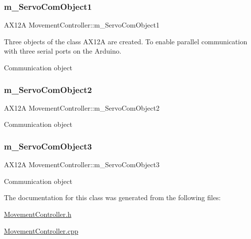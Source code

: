 \subsubsection{\texorpdfstring{m\+\_\+\+Servo\+Com\+Object1}{m\_ServoComObject1}}
{\footnotesize\ttfamily A\+X12A Movement\+Controller\+::m\+\_\+\+Servo\+Com\+Object1}



Three objects of the class A\+X12A are created. To enable parallel communication with three serial ports on the Arduino. 

Communication object \mbox{\label{class_movement_controller_abd74aff807ff311c6891311414ae3993}} 
\subsubsection{\texorpdfstring{m\+\_\+\+Servo\+Com\+Object2}{m\_ServoComObject2}}
{\footnotesize\ttfamily A\+X12A Movement\+Controller\+::m\+\_\+\+Servo\+Com\+Object2}

Communication object \mbox{\label{class_movement_controller_afbe7c5a0e099b5e879d64b6ab72f7127}} 
\subsubsection{\texorpdfstring{m\+\_\+\+Servo\+Com\+Object3}{m\_ServoComObject3}}
{\footnotesize\ttfamily A\+X12A Movement\+Controller\+::m\+\_\+\+Servo\+Com\+Object3}

Communication object 

The documentation for this class was generated from the following files\+:\begin{DoxyCompactItemize}
\item 
\mbox{\hyperlink{_movement_controller_8h}{Movement\+Controller.\+h}}\item 
\mbox{\hyperlink{_movement_controller_8cpp}{Movement\+Controller.\+cpp}}\end{DoxyCompactItemize}
